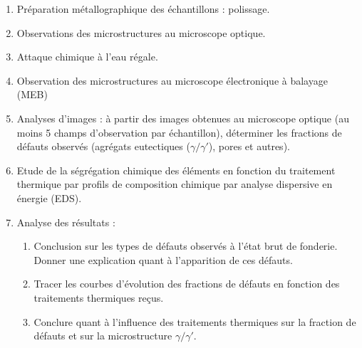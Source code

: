 
\begin{enumerate}
    \item Préparation métallographique des échantillons : polissage.
    \item Observations des microstructures au microscope optique.
    \item Attaque chimique à l’eau régale.
    \item Observation des microstructures au microscope électronique à balayage (MEB)
    \item Analyses d’images : à partir des images obtenues au microscope optique (au moins 5 champs d’observation par échantillon), déterminer les fractions de défauts observés (agrégats
    eutectiques ($\gamma / \gamma'$), pores et autres).
    \item Etude de la ségrégation chimique des éléments en fonction du traitement thermique par
    profils de composition chimique par analyse dispersive en énergie (EDS).
    \item Analyse des résultats :
        \begin{enumerate}[label=\alph*]
            \item Conclusion sur les types de défauts observés à l’état brut de fonderie. Donner une explication quant à l’apparition de ces défauts.
            \item Tracer les courbes d’évolution des fractions de défauts en fonction des traitements thermiques reçus.
            \item Conclure quant à l’influence des traitements thermiques sur la fraction de défauts et sur la microstructure $\gamma / \gamma'$. 
        \end{enumerate}
\end{enumerate}

